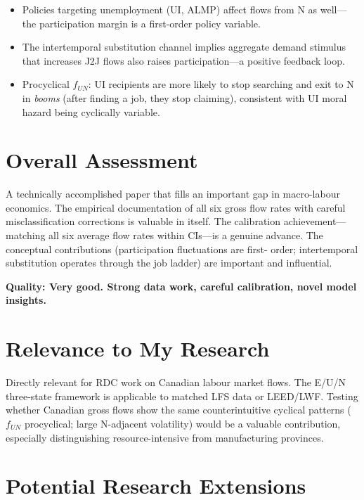 \begin{itemize}
  \item Policies targeting unemployment (UI, ALMP) affect flows from N
    as well---the participation margin is a first-order policy variable.
  \item The intertemporal substitution channel implies aggregate demand
    stimulus that increases J2J flows also raises participation---a positive
    feedback loop.
  \item Procyclical $f_{UN}$: UI recipients are more likely to stop searching
    and exit to N in \emph{booms} (after finding a job, they stop claiming),
    consistent with UI moral hazard being cyclically variable.
\end{itemize}

\section{Overall Assessment}

A technically accomplished paper that fills an important gap in macro-labour
economics. The empirical documentation of all six gross flow rates with careful
misclassification corrections is valuable in itself. The calibration
achievement---matching all six average flow rates within CIs---is a genuine
advance. The conceptual contributions (participation fluctuations are first-
order; intertemporal substitution operates through the job ladder) are
important and influential.

\textbf{Quality: Very good. Strong data work, careful calibration,
novel model insights.}

\section{Relevance to My Research}

Directly relevant for RDC work on Canadian labour market flows. The E/U/N
three-state framework is applicable to matched LFS data or LEED/LWF. Testing
whether Canadian gross flows show the same counterintuitive cyclical patterns
($f_{UN}$ procyclical; large N-adjacent volatility) would be a valuable
contribution, especially distinguishing resource-intensive from manufacturing
provinces.

\section{Potential Research Extensions}

